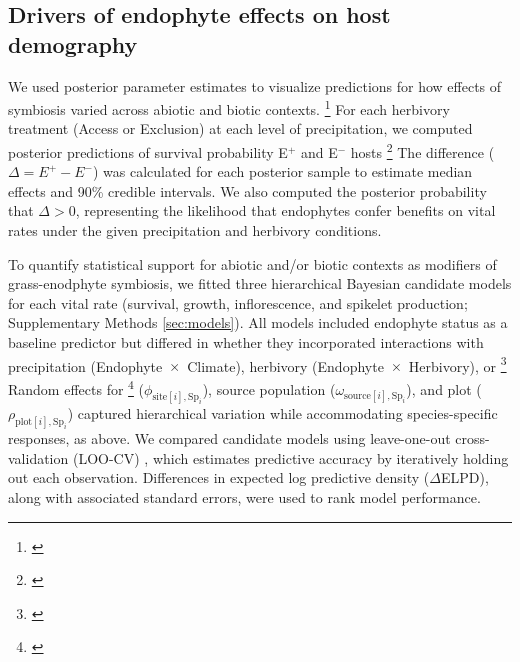 \documentclass[12pt]{article}\usepackage[]{graphicx}\usepackage[dvipsnames]{xcolor}
\newcommand{\tom}[2]{{\color{red}{#1}}\footnote{\textit{\color{red}{#2}}}}
\begin{document}
\subsection*{Drivers of endophyte effects on host demography}
We used posterior parameter estimates to visualize predictions for how effects of symbiosis varied across abiotic and biotic contexts. 
\tom{For each vital rate, precipitation was summarized at key quantiles (10th, 25th, 50th, 75th, and 90th percentiles) to represent the range of site-level abiotic stress. }{I do not follow the significance or value of considering quantiles. Why not treat precipitation continuously? We an indicate quantiles on the x axis of a figure, if your idea is to represent the realistic range of ppt variation. Note that species would differ in their quantiles because only ELVI is at Sonora.}
For each herbivory treatment (Access or Exclusion) at each level of precipitation, we computed posterior predictions of survival probability E$^+$ and E$^-$ hosts \tom{using the best Bayesian model outputs (Eq.~\ref{eq:full_model}). }{I don't know what you mean by ``best''.}
The difference ($\Delta = E^+ - E^-$) was calculated for each posterior sample to estimate median effects and 90\% credible intervals. 
We also computed the posterior probability that $\Delta > 0$, representing the likelihood that endophytes confer benefits on vital rates under the given precipitation and herbivory conditions.

To quantify statistical support for abiotic and/or biotic contexts as modifiers of grass-enodphyte symbiosis, we fitted three hierarchical Bayesian candidate models for each vital rate (survival, growth, inflorescence, and spikelet production; Supplementary Methods \ref{sec:models}).
All models included endophyte status as a baseline predictor but differed in whether they incorporated interactions with precipitation (Endophyte~$\times$~Climate), herbivory (Endophyte~$\times$~Herbivory), or \tom{both factors, including the three-way interaction (Endophyte~$\times$~Climate~$\times$~Herbivory).}{This is the same as Eq 1, yes?}
Random effects for \tom{site-year}{Here you say site-year and above you say site. WHich is it?} ($\phi_{\text{site}[i],\text{Sp}_i}$), source population ($\omega_{\text{source}[i],\text{Sp}_i}$), and plot ($\rho_{\text{plot}[i],\text{Sp}_i}$) captured hierarchical variation while accommodating species-specific responses, as above.
We compared candidate models using leave-one-out cross-validation (LOO-CV) \citep{vehtari2017practical}, which estimates predictive accuracy by iteratively holding out each observation. 
Differences in expected log predictive density ($\Delta$ELPD), along with associated standard errors, were used to rank model performance.
\end{document}
